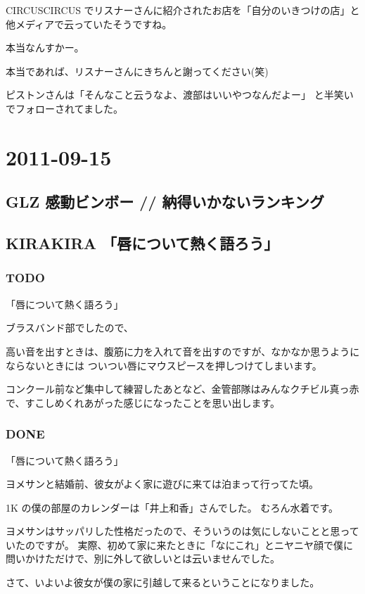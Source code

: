 \documentclass[11pt]{article}
\begin{document}
CIRCUSCIRCUS でリスナーさんに紹介されたお店を「自分のいきつけの店」と
他メディアで云っていたそうですね。

本当なんすかー。

本当であれば、リスナーさんにきちんと謝ってください(笑)

ピストンさんは「そんなこと云うなよ、渡部はいいやつなんだよー」
と半笑いでフォローされてました。
\section{2011-09-15}
\label{sec-70}
\subsection{GLZ 感動ビンボー // 納得いかないランキング}
\label{sec-70_1}
\subsection{KIRAKIRA 「唇について熱く語ろう」}
\label{sec-70_2}
\subsubsection{\textbf{TODO}}
\label{sec-70_2_1}

「唇について熱く語ろう」

ブラスバンド部でしたので、

高い音を出すときは、腹筋に力を入れて音を出すのですが、なかなか思うようにならないときには
ついつい唇にマウスピースを押しつけてしまいます。

コンクール前など集中して練習したあとなど、金管部隊はみんなクチビル真っ赤で、すこしめくれあがった感じになったことを思い出します。
\subsubsection{\textbf{DONE}}
\label{sec-70_2_2}

「唇について熱く語ろう」

ヨメサンと結婚前、彼女がよく家に遊びに来ては泊まって行ってた頃。

1K の僕の部屋のカレンダーは「井上和香」さんでした。
むろん水着です。

ヨメサンはサッパリした性格だったので、そういうのは気にしないことと思っていたのですが。
実際、初めて家に来たときに「なにこれ」とニヤニヤ顔で僕に問いかけただけで、別に外して欲しいとは云いませんでした。

さて、いよいよ彼女が僕の家に引越して来るということになりました。
\end{document}
